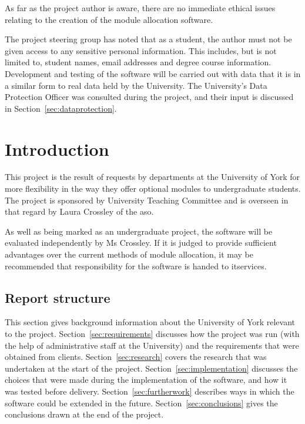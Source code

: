 \documentclass[draft]{scrartcl}
\begin{document}

As far as the project author is aware, there are no immediate ethical issues
relating to the creation of the module allocation software.


The project steering group has noted that as a student, the author must not be
given access to any sensitive personal information. This includes, but is not
limited to, student names, email addresses and degree course information.
Development and testing of the software will be carried out with data that it
is in a similar form to real data held by the University. The University's
Data Protection Officer was consulted during the project, and their input is
discussed in Section~\ref{sec:dataprotection}.

\section{Introduction}


This project is the result of requests by departments at the University of
York for more flexibility in the way they offer optional modules to
undergraduate students. The project is sponsored by University Teaching
Committee and is overseen in that regard by Laura Crossley of the \gls{aso}.

As well as being marked as an undergraduate project, the software will be
evaluated independently by Ms Crossley. If it is judged to provide sufficient
advantages over the current methods of module allocation, it may be
recommended that responsibility for the software is handed to \gls{itservices}.

\subsection{Report structure}

This section gives background information about the University of York
relevant to the project. Section~\ref{sec:requirements} discusses how the
project was run (with the help of administrative staff at the University) and
the requirements that were obtained from clients. Section~\ref{sec:research}
covers the research that was undertaken at the start of the project.
Section~\ref{sec:implementation} discusses the choices that were made during
the implementation of the software, and how it was tested before delivery.
Section~\ref{sec:furtherwork} describes ways in which the software could be
extended in the future. Section~\ref{sec:conclusions} gives the conclusions
drawn at the end of the project.
\end{document}
